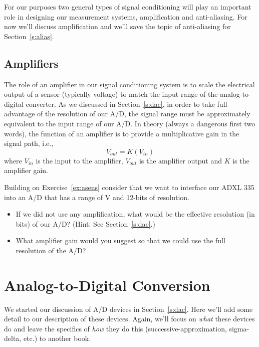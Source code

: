 For our purposes two general types of signal conditioning will play an important role in designing our measurement systems, amplification and anti-aliasing.  For now we'll discuss amplification and we'll save the topic of anti-aliasing for Section~\ref{s:alias}.

\subsection{Amplifiers}
The role of an amplifier in our signal conditioning system is to scale the electrical output of a sensor (typically voltage) to match the input range of the analog-to-digital converter.  As we discussed in Section~\ref{s:dac}, in order to take full advantage of the resolution of our A/D, the signal range must be approximately equivalent to the input range of our A/D.  In theory (always a dangerous first two words), the function of an amplifier is to provide a multiplicative gain in the signal path, i.e., 
\[
V_{out} = K\left(V_{in}\right)
\]
where $V_{in}$ is the input to the amplifier, $V_{out}$ is the amplifier output and $K$ is the amplifier gain. 

\begin{ex}
Building on Exercise~\ref{ex:asens} consider that we want to interface our ADXL 335 into an A/D that has a range of \unit[0--10]{V} and 12-bits of resolution.  
\begin{itemize}
\item If we did not use any amplification, what would be the effective resolution (in bits) of our A/D?  (Hint: See Section~\ref{s:dac}.)
\item What amplifier gain would you suggest so that we could use the full resolution of the A/D?
\end{itemize}
\end{ex}

\section{Analog-to-Digital Conversion}
We started our discussion of A/D devices in Section~\ref{s:dac}.  Here we'll add some detail to our description of these devices.  Again, we'll focus on \emph{what} these devices do and leave the specifics of \emph{how} they do this (successive-approximation, sigma-delta, etc.) to another book.
